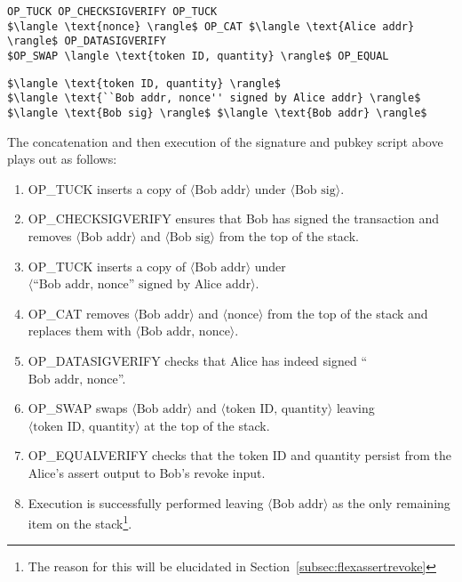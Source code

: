 \documentclass[9pt,oneside]{amsart}
\begin{document}
\begin{multicols}{2}
\begin{lstlisting}[title={\textbf{Alice's Assert PubKey Script}}]
OP_TUCK OP_CHECKSIGVERIFY OP_TUCK
$\langle \text{nonce} \rangle$ OP_CAT $\langle \text{Alice addr} \rangle$ OP_DATASIGVERIFY
$OP_SWAP \langle \text{token ID, quantity} \rangle$ OP_EQUAL
\end{lstlisting}

\begin{lstlisting}[title={\textbf{Bob's Revoke Signature Script}}]
$\langle \text{token ID, quantity} \rangle$ 
$\langle \text{``Bob addr, nonce'' signed by Alice addr} \rangle$ $\langle \text{Bob sig} \rangle$ $\langle \text{Bob addr} \rangle$ 
\end{lstlisting}

The concatenation and then execution of the signature and pubkey script above plays out as follows:
\begin{enumerate}
    \item OP\_TUCK inserts a copy of $\langle \text{Bob addr} \rangle$ under $\langle \text{Bob sig} \rangle$.
    \item OP\_CHECKSIGVERIFY ensures that Bob has signed the transaction and removes $\langle \text{Bob addr} \rangle$ and $\langle \text{Bob sig} \rangle$ from the top of the stack.
    \item OP\_TUCK inserts a copy of $\langle \text{Bob addr} \rangle$ under $\langle \text{``Bob addr, nonce'' signed by Alice addr} \rangle$.
    \item OP\_CAT removes $\langle \text{Bob addr} \rangle$ and $\langle \text{nonce} \rangle$ from the top of the stack and replaces them with $\langle \text{Bob addr, nonce} \rangle$. 
    \item OP\_DATASIGVERIFY  checks that Alice has indeed signed ``$\text{Bob addr, nonce}$''.
    \item OP\_SWAP swaps $\langle \text{Bob addr} \rangle$ and $\langle \text{token ID, quantity} \rangle$ leaving $\langle \text{token ID, quantity} \rangle$ at the top of the stack.
    \item OP\_EQUALVERIFY checks that the token ID and quantity persist from the Alice's assert output to Bob's revoke input.
    \item Execution is successfully performed leaving $\langle \text{Bob addr} \rangle$ as the only remaining item on the stack\footnote{The reason for this will be elucidated in Section~\ref{subsec:flexassertrevoke}}.
\end{enumerate}



\end{multicols}
\end{document}
